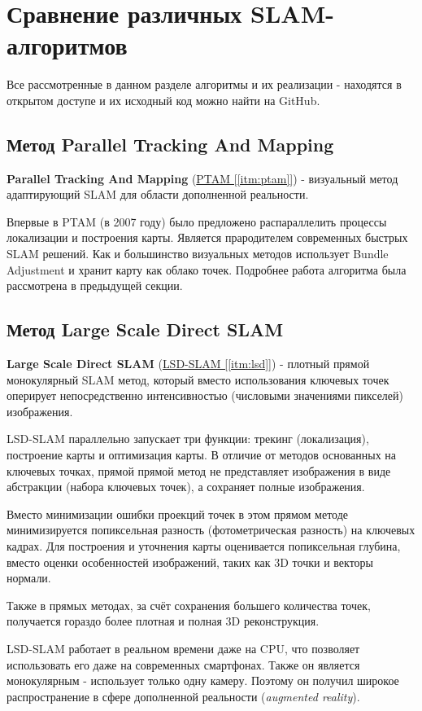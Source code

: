 \section{Сравнение различных SLAM-алгоритмов}

Все рассмотренные в данном разделе алгоритмы и их реализации - находятся в открытом доступе и их исходный код можно найти на GitHub.

\subsection{Метод Parallel Tracking And Mapping}
\textbf{Parallel Tracking And Mapping} (\hyperref[itm:ptam]{PTAM [\ref{itm:ptam}]}) - визуальный метод адаптирующий SLAM для области дополненной реальности.

Впервые в PTAM (в 2007 году) было предложено распараллелить процессы локализации и построения карты. Является прародителем современных быстрых SLAM решений. Как и большинство визуальных методов использует Bundle Adjustment и хранит карту как облако точек. Подробнее работа алгоритма была рассмотрена в предыдущей секции.

\subsection{Метод Large Scale Direct SLAM}
\textbf{Large Scale Direct SLAM} (\hyperref[itm:lsd]{LSD-SLAM [\ref{itm:lsd}]}) - плотный прямой монокулярный SLAM метод, который вместо использования ключевых точек оперирует непосредственно интенсивностью (числовыми значениями пикселей) изображения.

LSD-SLAM параллельно запускает три функции: трекинг (локализация), построение карты и оптимизация карты. В отличие от методов основанных на ключевых точках, прямой прямой метод не представляет изображения в виде абстракции (набора ключевых точек), а сохраняет полные изображения.

Вместо минимизации ошибки проекций точек в этом прямом методе минимизируется попиксельная разность (фотометрическая разность) на ключевых кадрах. Для построения и уточнения карты оценивается попиксельная глубина, вместо оценки особенностей изображений, таких как 3D точки и векторы нормали.

Также в прямых методах, за счёт сохранения большего количества точек, получается гораздо более плотная и полная 3D реконструкция.

LSD-SLAM работает в реальном времени даже на CPU, что позволяет использовать его даже на современных смартфонах. Также он является монокулярным - использует только одну камеру. Поэтому он получил широкое распространение в сфере дополненной реальности (\textit{augmented reality}).

